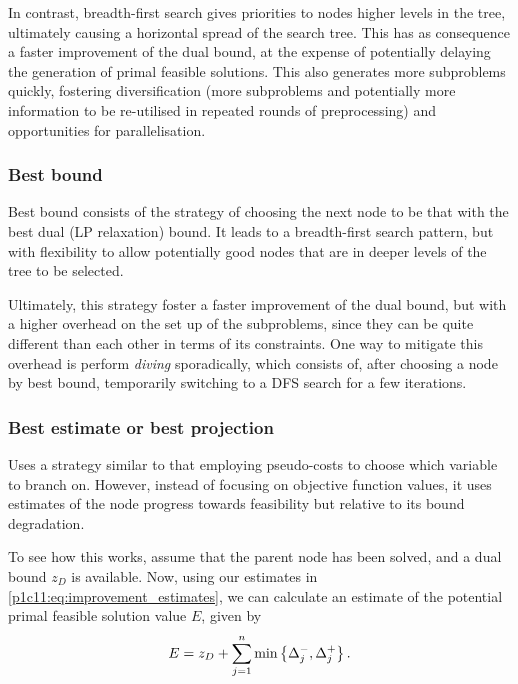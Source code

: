In contrast, breadth-first search gives priorities to nodes higher levels in the tree, ultimately causing a horizontal spread of the search tree. This has as consequence a faster improvement of the dual bound, at the expense of potentially delaying the generation of primal feasible solutions. This also generates more subproblems quickly, fostering diversification (more subproblems and potentially more information to be re-utilised in repeated rounds of preprocessing) and opportunities for parallelisation. 


\subsubsection{Best bound}

Best bound consists of the strategy of choosing the next node to be that with the best dual (LP relaxation) bound. It leads to a breadth-first search pattern, but with flexibility to allow potentially good nodes that are in deeper levels of the tree to be selected. 

Ultimately, this strategy foster a faster improvement of the dual bound, but with a higher overhead on the set up of the subproblems, since they can be quite different than each other in terms of its constraints. One way to mitigate this overhead is perform \emph{diving} sporadically, which consists of, after choosing a node by best bound, temporarily switching to a DFS search for a few iterations.


\subsubsection{Best estimate or best projection}

Uses a strategy similar to that employing pseudo-costs to choose which variable to branch on. However, instead of focusing on objective function values, it uses estimates of the node progress towards feasibility but relative to its bound degradation. 

To see how this works, assume that the parent node has been solved, and a dual bound $z_D$ is available. Now, using our estimates in \eqref{p1c11:eq:improvement_estimates}, we can calculate an estimate of the potential primal feasible solution value $E$, given by
%
\begin{equation*}
	E = z_D + \sum_{j = 1}^n \min\left\{ \Delta^-_j, \Delta^+_j \right \}.	
\end{equation*}
%

